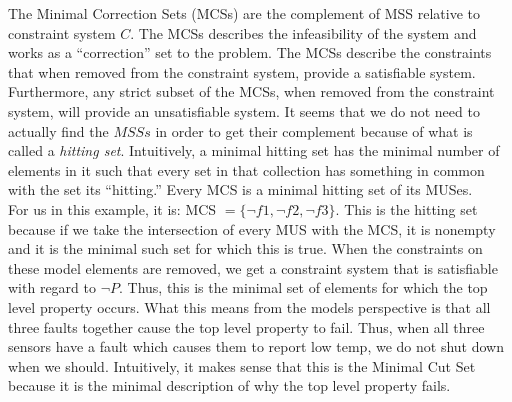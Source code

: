 The Minimal Correction Sets (MCSs) are the complement of MSS relative to constraint system $C$. The MCSs describes the infeasibility of the system and works as a ``correction'' set to the problem. The MCSs describe the constraints that when removed from the constraint system, provide a satisfiable system. Furthermore, any strict subset of the MCSs, when removed from the constraint system, will provide an unsatisfiable system. It seems that we do not need to actually find the $MSSs$ in order to get their complement because of what is called a \textit{hitting set}. Intuitively, a minimal hitting set has the minimal number of elements in it such that every set in that collection has something in common with the set its ``hitting.'' Every MCS is a minimal hitting set of its MUSes.\\

For us in this example, it is: MCS $ = \{\neg f1, \neg f2, \neg f3\}$. This is the hitting set because if we take the intersection of every MUS with the MCS, it is nonempty and it is the minimal such set for which this is true. When the constraints on these model elements are removed, we get a constraint system that is satisfiable with regard to $\neg P$. Thus, this is the minimal set of elements for which the top level property occurs. What this means from the models perspective is that all three faults together cause the top level property to fail. Thus, when all three sensors have a fault which causes them to report low temp, we do not shut down when we should. Intuitively, it makes sense that this is the Minimal Cut Set because it is the minimal description of why the top level property fails. \\






































